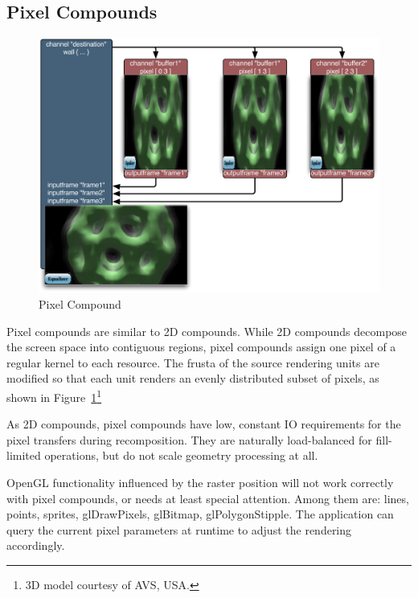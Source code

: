 \documentclass[10pt,a4]{scrartcl}
\newcommand{\fig}[1]{Figure~\ref{#1}}
\begin{document}
\subsection{Pixel Compounds}

\begin{figure}
  \vspace{-2ex}\includegraphics[width=.618\textwidth]{images/Pixel.pdf}
  {\caption{\label{fPixel}Pixel Compound}}\vspace{-8ex}
\end{figure}
Pixel compounds are similar to 2D compounds. While 2D compounds decompose the
screen space into contiguous regions, pixel compounds assign one pixel of a
regular kernel to each resource. The frusta of the source rendering units are
modified so that each unit renders an evenly distributed subset of pixels, as
shown in \fig{fPixel}\footnote{3D model courtesy of AVS, USA.}

As 2D compounds, pixel compounds have low, constant IO requirements for the
pixel transfers during recomposition. They are naturally load-balanced for
fill-limited operations, but do not scale geometry processing at all.

OpenGL functionality influenced by the raster position will not work
correctly with pixel compounds, or needs at least special
attention. Among them are: lines, points, sprites, glDrawPixels,
glBitmap, glPolygonStipple. The application can query the current pixel
parameters at runtime to adjust the rendering accordingly.
\end{document}
